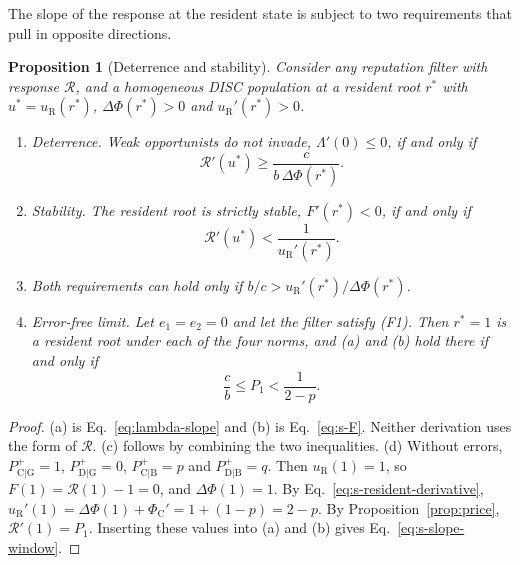 \documentclass[10pt]{wlscirep}
\newcommand{\Rmap}{\mathscr{R}}            %
\newcommand{\Pp}[1]{P^{+}_{\mathrm{#1}}}   %
\newcommand{\PhiC}{\Phi_{\mathrm{C}}}
\newcommand{\Pone}{P_{1}}                  %
\theoremstyle{plain}
\newtheorem{proposition}[lemma]{Proposition}
\theoremstyle{remark}
\begin{document}
The slope of the response at the resident state is subject to two requirements that pull in opposite directions.

\begin{proposition}[Deterrence and stability]\label{prop:slope}
Consider any reputation filter with response $\Rmap$, and a homogeneous DISC population at a resident root $r^*$ with $u^*=u_{\mathrm R}(r^*)$, $\Delta\Phi(r^*)>0$ and $u_{\mathrm R}'(r^*)>0$.
\begin{enumerate}
\item[(a)] \textit{Deterrence.} Weak opportunists do not invade, $\Lambda'(0)\leq0$, if and only if
\begin{equation}
\Rmap'(u^*)\geq\frac{c}{b\,\Delta\Phi(r^*)}.
\label{eq:s-slope-deterrence}
\end{equation}
\item[(b)] \textit{Stability.} The resident root is strictly stable, $F'(r^*)<0$, if and only if
\begin{equation}
\Rmap'(u^*)<\frac{1}{u_{\mathrm R}'(r^*)}.
\label{eq:s-slope-stability}
\end{equation}
\item[(c)] Both requirements can hold only if $b/c>u_{\mathrm R}'(r^*)/\Delta\Phi(r^*)$.
\item[(d)] \textit{Error-free limit.} Let $e_1=e_2=0$ and let the filter satisfy (F1). Then $r^*=1$ is a resident root under each of the four norms, and (a) and (b) hold there if and only if
\begin{equation}
\frac{c}{b}\leq\Pone<\frac{1}{2-p}.
\label{eq:s-slope-window}
\end{equation}
\end{enumerate}
\end{proposition}
\begin{proof}
(a) is Eq.~\eqref{eq:lambda-slope} and (b) is Eq.~\eqref{eq:s-F}. Neither derivation uses the form of $\Rmap$. (c) follows by combining the two inequalities. (d) Without errors, $\Pp{C|G}=1$, $\Pp{D|G}=0$, $\Pp{C|B}=p$ and $\Pp{D|B}=q$. Then $u_{\mathrm R}(1)=1$, so $F(1)=\Rmap(1)-1=0$, and $\Delta\Phi(1)=1$. By Eq.~\eqref{eq:s-resident-derivative}, $u_{\mathrm R}'(1)=\Delta\Phi(1)+\PhiC'=1+(1-p)=2-p$. By Proposition~\ref{prop:price}, $\Rmap'(1)=\Pone$. Inserting these values into (a) and (b) gives Eq.~\eqref{eq:s-slope-window}.
\end{proof}
\end{document}
